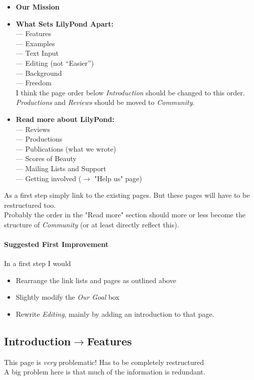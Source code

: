 \documentclass[10pt,a4paper,]{article}
\begin{document}
	\begin{itemize}
	\item \textbf{Our Mission}
	\item \textbf{What Sets LilyPond Apart:}\\
	--- Features\\
	--- Examples\\
	--- Text Input\\
	--- Editing (not “Easier”)\\
	--- Background\\
	--- Freedom\\
	I think the page order below \emph{Introduction} should be changed to this order.\\
	\emph{Productions} and \emph{Reviews} should be moved to \emph{Community}.
	\item \textbf{Read more about LilyPond:}\\
	--- Reviews\\
	--- Productions\\
	--- Publications (what we wrote)\\
	--- Scores of Beauty\\
	--- Mailing Lists and Support\\
	--- Getting involved ($\rightarrow$ "Help us" page)\\
	\end{itemize}
	As a first step simply link to the existing pages. But these pages will have to be restructured too.\\
	Probably the order in the "Read more" section should more or less become the structure of \emph{Community} (or at least directly reflect this).

\paragraph{Suggested First Improvement}
In a first step I would
\begin{itemize}
\item Rearrange the link lists and pages as outlined above
\item Slightly modify the \emph{Our Goal} box
\item Rewrite \emph{Editing}, mainly by adding an introduction to that page.
\end{itemize}

\vfill
\pagebreak
\subsection*{Introduction$\rightarrow$Features}
This page is \emph{very} problematic! Has to be completely restructured\\
A big problem here is that much of the information is redundant.
\end{document}
